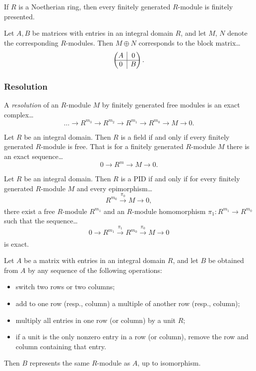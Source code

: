 \begin{lemma}
If $R$ is a Noetherian ring, then every finitely generated $R$-module is finitely presented.
\end{lemma}

\begin{lemma}
Let $A,B$ be matrices with entries in an integral domain $R$, and let $M$, $N$ denote the corresponding $R$-modules. Then
$M \oplus N$ corresponds to the block matrix\dots
\[
\begin{pmatrix}
A & \rvline & 0\\ \hline
0 & \rvline & B
\end{pmatrix}.
\]
\end{lemma}

\subsubsection{Resolution}\label{resolution}
A \emph{resolution} of an $R$-module $M$ by finitely generated free modules is an exact complex\dots
$$\dots \longrightarrow R^{m_3} \longrightarrow R^{m_2} \longrightarrow R^{m_1} \longrightarrow R^{m_0} \longrightarrow M \longrightarrow 0.$$

\begin{proposition}
Let $R$ be an integral domain. Then $R$ is a field if and only if every finitely generated $R$-module is free. That is for a finitely generated $R$-module $M$
there is an exact sequence\dots
$$0 \longrightarrow R^m \longrightarrow M \longrightarrow 0.$$
\end{proposition}

\begin{proposition}
Let $R$ be an integral domain. Then $R$ is a PID if and only if for every finitely generated $R$-module $M$ and every epimorphism\dots
$$R^{m_0} \xrightarrow[]{\pi_0} M \longrightarrow 0,$$
there exist a free $R$-module $R^{m_1}$ and an $R$-module homomorphism $\pi_1 : R^{m_1} \rightarrow R^{m_0}$ such that the sequence\dots
$$0 \longrightarrow R^{m_1} \xrightarrow[]{\pi_1} R^{m_0} \xrightarrow[]{\pi_0} M \longrightarrow 0$$
is exact.
\end{proposition}

\begin{proposition}
Let $A$ be a matrix with entries in an integral domain $R$, and let $B$ be obtained from $A$ by any sequence of the following operations:
\begin{itemize}
  \item switch two rows or two columns;
  \item add to one row (resp., column) a multiple of another row (resp., column);
  \item multiply all entries in one row (or column) by a unit $R$;
  \item if a unit is the only nonzero entry in a row (or column), remove the row and column containing that entry.
\end{itemize}
Then $B$ represents the same $R$-module as $A$, up to isomorphism.
\end{proposition}